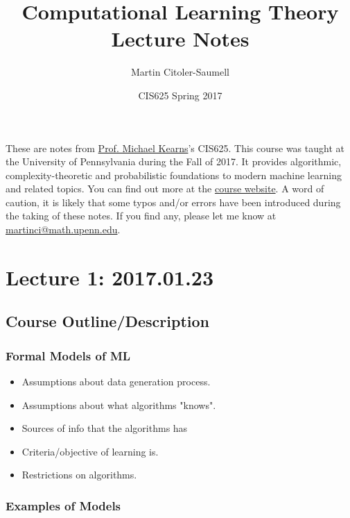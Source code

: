 \documentclass[12pt, letterpaper]{article}
\title{Computational Learning Theory Lecture Notes}
\author{Martin Citoler-Saumell}
\date{CIS625 Spring 2017}
\numberwithin{equation}{section} %
\theoremstyle{definition}
\theoremstyle{remark}
\begin{document}
\maketitle

These are notes from \href{http://www.cis.upenn.edu/~mkearns/}{Prof. Michael Kearns}'s CIS625.
This course was taught at the University of Pennsylvania during the Fall of 2017. It provides algorithmic, complexity-theoretic and probabilistic foundations to modern machine learning and related topics.
 You can find out more at the \href{http://www.cis.upenn.edu/~mkearns/teaching/COLT/}{course website}.
 A word of caution, it is likely that some typos and/or errors have been introduced during the taking of these notes. If you find any, please let me know at \href{mailto:martinci@math.upenn.edu}{martinci@math.upenn.edu}.

\tableofcontents

\section{Lecture 1: 2017.01.23}

\subsection{Course Outline/Description}

\subsubsection{Formal Models of ML}

\begin{itemize}
	\item Assumptions about data generation process.
	\item Assumptions about what algorithms "knows".
	\item Sources of info that the algorithms has
	\item Criteria/objective of learning is.
	\item Restrictions on algorithms.
\end{itemize}

\subsubsection{Examples of Models}
\end{document}
